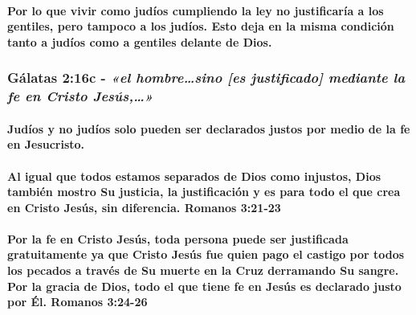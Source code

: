 \documentclass[11a pt,twoside]{article}
\newcommand{\scripture}[1]{%
  {\fontsize{12pt}{16pt}\selectfont\ScriptureFont\itshape #1}%
}
\let\oldsubsubsection\subsubsection
\renewcommand{\subsubsection}{\needspace{4\baselineskip}\oldsubsubsection}
\let\oldparagraph\paragraph
\renewcommand{\paragraph}{\needspace{3\baselineskip}\oldparagraph}
\begin{document}
\paragraph{Por lo que vivir como judíos cumpliendo la ley no
justificaría a los gentiles, pero tampoco a los judíos. Esto deja en la
misma condición tanto a judíos como a gentiles delante de
Dios.}\label{por-lo-que-vivir-como-juduxedos-cumpliendo-la-ley-no-justificaruxeda-a-los-gentiles-pero-tampoco-a-los-juduxedos.-esto-deja-en-la-misma-condiciuxf3n-tanto-a-juduxedos-como-a-gentiles-delante-de-dios.}

\subsubsection{\texorpdfstring{Gálatas 2:16c -
\scripture{«el hombre…sino [es justificado] mediante la fe en Cristo Jesús,…»}}{Gálatas 2:16c - }}\label{guxe1latas-216c---el-hombresino-es-justificado-mediante-la-fe-en-cristo-jesuxfas}

\paragraph{Judíos y no judíos solo pueden ser declarados justos por
medio de la fe en
Jesucristo.}\label{juduxedos-y-no-juduxedos-solo-pueden-ser-declarados-justos-por-medio-de-la-fe-en-jesucristo.}

\paragraph{Al igual que todos estamos separados de Dios como injustos,
Dios también mostro Su justicia, la justificación y es para todo el que
crea en Cristo Jesús, sin diferencia. Romanos
3:21-23}\label{al-igual-que-todos-estamos-separados-de-dios-como-injustos-dios-tambiuxe9n-mostro-su-justicia-la-justificaciuxf3n-y-es-para-todo-el-que-crea-en-cristo-jesuxfas-sin-diferencia.-romanos-321-23}

\paragraph{Por la fe en Cristo Jesús, toda persona puede ser justificada
gratuitamente ya que Cristo Jesús fue quien pago el castigo por todos
los pecados a través de Su muerte en la Cruz derramando Su sangre. Por
la gracia de Dios, todo el que tiene fe en Jesús es declarado justo por
Él. Romanos
3:24-26}\label{por-la-fe-en-cristo-jesuxfas-toda-persona-puede-ser-justificada-gratuitamente-ya-que-cristo-jesuxfas-fue-quien-pago-el-castigo-por-todos-los-pecados-a-travuxe9s-de-su-muerte-en-la-cruz-derramando-su-sangre.-por-la-gracia-de-dios-todo-el-que-tiene-fe-en-jesuxfas-es-declarado-justo-por-uxe9l.-romanos-324-26}
\end{document}
